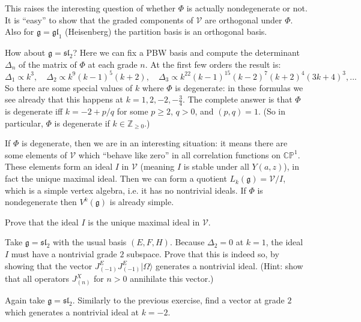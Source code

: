 \documentclass[12pt,letterpaper,reqno]{amsart}
\numberwithin{equation}{section}
\newcommand{\fg}{{\mathfrak g}}
\newcommand{\fgl}{{\mathfrak {gl}}}
\newcommand{\fsl}{{\mathfrak {sl}}}
\newcommand{\bbC}{\ensuremath{\mathbb C}}
\newcommand{\bbP}{\ensuremath{\mathbb P}}
\newcommand{\bbZ}{\ensuremath{\mathbb Z}}
\newcommand\vac{{|\Omega\rangle}}
\newcommand{\vertex}{\mathcal{V}}
\begin{document}
\begin{example}
This raises the interesting question of whether $\Phi$
is actually nondegenerate or not. It is ``easy'' to show
that the graded components of $\vertex$ are orthogonal
under $\Phi$. Also for $\fg = \fgl_1$ (Heisenberg)
the partition basis is an orthogonal basis.

How about $\fg = \fsl_2$? Here we can fix a PBW basis 
and compute the 
determinant $\Delta_n$ of the matrix of $\Phi$ at each grade $n$.
At the first few orders the result is:
\begin{equation}
  \Delta_1 \propto k^3, \quad \Delta_2 \propto k^9(k-1)^5(k+2), \quad \Delta_3 \propto k^{22}(k-1)^{15}(k-2)^7(k+2)^4(3k+4)^3, ...
\end{equation}
So there are some special values of $k$ where $\Phi$ 
is degenerate: in these formulas we see already that this
happens at $k = 1, 2, -2, -\frac34$.
The complete answer is that $\Phi$ is degenerate iff
$k = -2 + p/q$ for some $p \ge 2$, $q > 0$, and $(p,q) = 1$. 
(So in particular, $\Phi$ is degenerate if $k \in \bbZ_{\ge 0}$.)

If $\Phi$ is degenerate, then we are in an 
interesting situation: it means there are some elements
of $\vertex$ which ``behave like zero'' in all correlation
functions on $\bbC \bbP^1$. These elements
form an ideal $I$ in $\vertex$ (meaning $I$ is stable
under all $Y(a,z)$), in fact the unique maximal ideal. 
Then we can form a quotient $L_k(\fg) = \vertex/I$, 
which is a simple vertex algebra, i.e. it has no nontrivial ideals.
If $\Phi$ is nondegenerate then $V^k(\fg)$ is already
simple.

\end{example}


\begin{exercise} Prove that the ideal $I$ is the unique maximal ideal in $\vertex$.
\end{exercise}

\begin{exercise} Take $\fg = \fsl_2$ with the usual basis $(E, F, H)$. 
Because $\Delta_2 = 0$ at $k = 1$, the ideal $I$ must have a nontrivial grade $2$ subspace.
Prove that this is indeed so, by showing that the vector $J^E_{(-1)} J^E_{(-1)} \vac$ generates 
a nontrivial ideal. (Hint: show that all operators $J^X_{(n)}$ for $n > 0$ annihilate this vector.)
\end{exercise}

\begin{exercise} Again take $\fg = \fsl_2$. Similarly to the previous exercise, find a vector at grade $2$ which generates a nontrivial ideal at $k = -2$.
\end{exercise}
\end{document}
